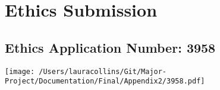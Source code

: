 \chapter{Ethics Submission}


\section{Ethics Application Number: 3958}

  \texttt{[image: /Users/lauracollins/Git/Major-Project/Documentation/Final/Appendix2/3958.pdf]}
  

